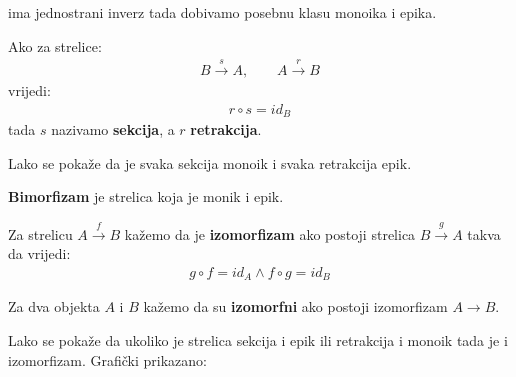     ima jednostrani inverz tada dobivamo posebnu klasu monoika i epika.
    \begin{definition}
      Ako za strelice:
      \begin{align*}
        B \xrightarrow{s} A, \qquad A \xrightarrow{r} B
      \end{align*}
      vrijedi:
      \begin{align*}
        r \circ s = id_B
      \end{align*}
      tada $s$ nazivamo \textbf{sekcija}, a $r$ \textbf{retrakcija}.
    \end{definition}
    Lako se pokaže da je svaka sekcija monoik i svaka retrakcija epik.
    \begin{definition}
      \textbf{Bimorfizam} je strelica koja je monik i epik.
    \end{definition}
    \begin{definition}
      Za strelicu $A \xrightarrow{f} B$ kažemo da je \textbf{izomorfizam} ako
      postoji strelica $B \xrightarrow{g} A$ takva da vrijedi:
      \begin{align}
        g \circ f = id_A \wedge f \circ g = id_B
      \end{align}
    \end{definition}
    \begin{definition}
      Za dva objekta $A$ i $B$ kažemo da su \textbf{izomorfni} ako postoji izomorfizam
      $A \xrightarrow{} B$.
    \end{definition}

    Lako se pokaže da ukoliko je strelica sekcija i epik ili retrakcija i
    monoik tada je i izomorfizam.
    Grafički prikazano:
    \begin{center}
    \end{center}
  \newpage

